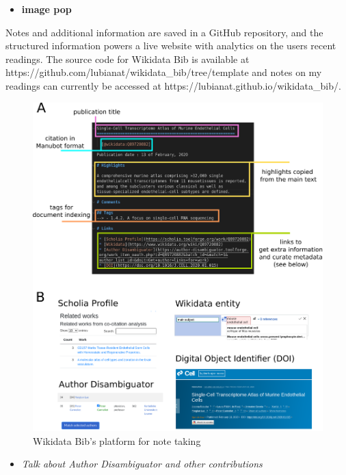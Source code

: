 \begin{itemize}
\tightlist
\item
  \textbf{image pop}
\end{itemize}

Notes and additional information are saved in a GitHub repository, and the structured information powers a live website with analytics on the users recent readings.
The source code for Wikidata Bib is available at https://github.com/lubianat/wikidata\_bib/tree/template and notes on my readings can currently be accessed at https://lubianat.github.io/wikidata\_bib/.

\begin{figure}
\hypertarget{fig:notetaking}{%
\centering
\includegraphics{images/note_taking_station_annotated_with_links.png}
\caption{Wikidata Bib's platform for note taking}\label{fig:notetaking}
}
\end{figure}

\begin{itemize}
\tightlist
\item
  \emph{Talk about Author Disambiguator and other contributions}
\end{itemize}

